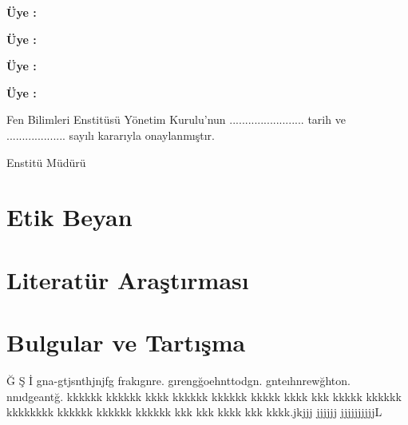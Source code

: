 \documentclass[]{esogu}			%
\begin{document}
\noindent \textbf{Üye :\space}\jiki

\noindent \textbf{Üye :\space}\juc

\noindent \textbf{Üye :\space}\jdort

\noindent \textbf{Üye :\space}\jbes


\begin{framed}
Fen Bilimleri Enstitüsü Yönetim Kurulu'nun ........................ tarih ve  \space \space \space \space \space\\................... sayılı kararıyla onaylanmıştır. 
\newline
\newline
\begin{flushright}
\mudur \hspace{1cm}

Enstitü Müdürü\space \space \space \space \space \space \space \space \space \space \space \space \space  %
\end{flushright}

\end{framed}


\renewcommand{\listfigurename}{Şekiller Dizini}
\renewcommand{\listtablename}{Çizelgeler Dizini}


\chapter{Etik Beyan}

\clearpage







\tableofcontents
\newpage
\listoffigures
\newpage
\listoftables

\clearpage


\mainmatter %
\setcounter{secnumdepth}{5} %



\chapter{Literatür Araştırması}					%
\lipsum 
\chapter{Bulgular ve Tartışma}		%
Ğ Ş İ gna-gtjsnthjnjfg frakıgnre. gırengğoehnttodgn. gnteıhnrewğhton. nnıdgeantğ. kkkkkk kkkkkk kkkk   kkkkkk kkkkkk kkkkk kkkk kkk kkkkk kkkkkk kkkkkkkk kkkkkk  kkkkkk kkkkkk kkk kkk kkkk kkk kkkk.jkjjj jjjjjj jjjjjjjjjjL 
	

%
\newpage
\end{document}
